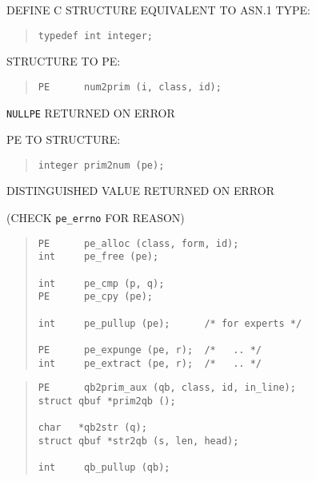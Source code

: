 \begin{bwslide}

\begin{nrtc}
\item	DEFINE C STRUCTURE EQUIVALENT TO ASN.1 TYPE:
\begin{quote}\small\begin{verbatim}
typedef int integer;
\end{verbatim}\end{quote}

\item	STRUCTURE TO PE:
\begin{quote}\small\begin{verbatim}
PE      num2prim (i, class, id);
\end{verbatim}\end{quote}
\verb"NULLPE" RETURNED ON ERROR

\item	PE TO STRUCTURE:
\begin{quote}\small\begin{verbatim}
integer prim2num (pe);
\end{verbatim}\end{quote}
DISTINGUISHED VALUE RETURNED ON ERROR
    \begin{nrtc}
    \item	(CHECK \verb"pe_errno" FOR REASON)
    \end{nrtc}
\end{nrtc}
\end{bwslide}


\begin{bwslide}

\begin{quote}\small\begin{verbatim}
PE      pe_alloc (class, form, id);
int     pe_free (pe);

int     pe_cmp (p, q);
PE      pe_cpy (pe);

int     pe_pullup (pe);      /* for experts */

PE      pe_expunge (pe, r);  /*   .. */
int     pe_extract (pe, r);  /*   .. */
\end{verbatim}\end{quote}
\end{bwslide}


\begin{bwslide}

\begin{quote}\small\begin{verbatim}
PE      qb2prim_aux (qb, class, id, in_line);
struct qbuf *prim2qb ();

char   *qb2str (q);
struct qbuf *str2qb (s, len, head);

int     qb_pullup (qb);
\end{verbatim}\end{quote}
\end{bwslide}


